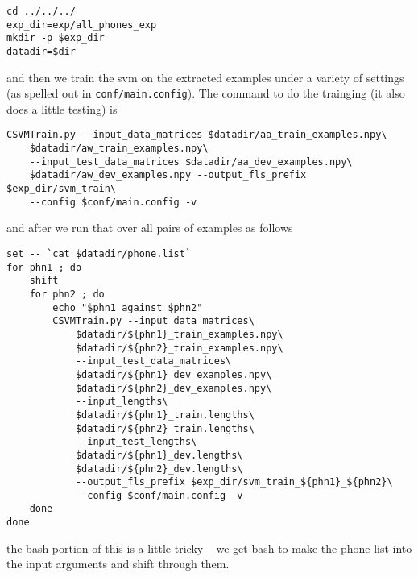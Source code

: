 \documentclass{article}
\begin{document}
\begin{verbatim}
cd ../../../
exp_dir=exp/all_phones_exp
mkdir -p $exp_dir
datadir=$dir
\end{verbatim}
and then we train the svm on the extracted examples
under a variety of settings (as spelled out in \texttt{conf/main.config}).  The command to do the trainging (it also does a little
testing) is
\begin{verbatim}
CSVMTrain.py --input_data_matrices $datadir/aa_train_examples.npy\
    $datadir/aw_train_examples.npy\
    --input_test_data_matrices $datadir/aa_dev_examples.npy\
    $datadir/aw_dev_examples.npy --output_fls_prefix $exp_dir/svm_train\
    --config $conf/main.config -v
\end{verbatim}
and after we run that over all pairs of examples as follows
\begin{verbatim}
set -- `cat $datadir/phone.list`
for phn1 ; do
    shift
    for phn2 ; do
        echo "$phn1 against $phn2"
        CSVMTrain.py --input_data_matrices\
            $datadir/${phn1}_train_examples.npy\
            $datadir/${phn2}_train_examples.npy\
            --input_test_data_matrices\
            $datadir/${phn1}_dev_examples.npy\
            $datadir/${phn2}_dev_examples.npy\
            --input_lengths\
            $datadir/${phn1}_train.lengths\
            $datadir/${phn2}_train.lengths\
            --input_test_lengths\
            $datadir/${phn1}_dev.lengths\
            $datadir/${phn2}_dev.lengths\
            --output_fls_prefix $exp_dir/svm_train_${phn1}_${phn2}\
            --config $conf/main.config -v
    done
done
\end{verbatim}
the bash portion of this is a little tricky -- we get bash to
make the phone list into the input arguments and shift through
them.
\end{document}
